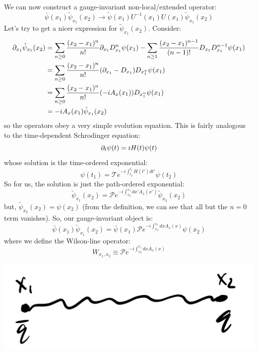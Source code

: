 We can now construct a gauge-invariant non-local/extended operator:
\begin{equation}
    \bar{\psi}(x_1)\tilde{\psi}_{x_1}(x_2) \to \tilde{\psi}(x_1)U^{-1}(x_1)U(x_1)\tilde{\psi}_{x_1}(x_2)
\end{equation}
Let's try to get a nicer expression for $\tilde{\psi}_{x_1}(x_2)$. Consider:
\begin{equation}
    \begin{split}
        \partial_{x_1}\tilde{\psi}_{x_1}(x_2) &= \sum_{n \geq 0}\frac{(x_2 - x_1)^n}{n!}\partial_{x_1}D^n_{x_1}\psi(x_1) - \sum_{n \geq 1} \frac{(x_2 - x_1)^{n-1}}{(n-1)!}D_{x_1}D_{x_1}^{n-1}\psi(x_1)
        \\ &= \sum_{n \geq 0}\frac{(x_2 - x_1)^n}{n!}(\partial_{x_1} - D_{x_1})D_{x_1^n}\psi(x_1)
        \\ &= \sum_{n \geq 0}\frac{(x_2 - x_1)^n}{n!}(-iA_{x}(x_1))D_{x_1^n}\psi(x_1)
        \\ &= -iA_x(x_1)\tilde{\psi}_{x_1}(x_2)
    \end{split}
\end{equation}
so the operators obey a very simple evolution equation. This is fairly analogous to the time-dependent Schrodinger equation:
\begin{equation}
    \partial_t \psi(t) = iH(t)\psi(t)
\end{equation}
whose solution is the time-ordered exponential:
\begin{equation}
    \psi(t_1) = \mathcal{T}e^{-i\int_{t_2}^{t_1}H(t')dt'}\psi(t_2)
\end{equation}
So for us, the solution is just the path-ordered exponential:
\begin{equation}
    \tilde{\psi}_{x_1}(x_2) = \mathcal{P}e^{-i\int_{x_2}^{x_1}dx'A_x(x')}\tilde{\psi}_{x_2}(x_2)
\end{equation}
but, $\tilde{\psi}_{x_2}(x_2) = \psi(x_2)$ (from the definition, we can see that all but the $n = 0$ term vanishes). So, our gauge-invariant object is:
\begin{equation}
    \bar{\psi}(x_1)\tilde{\psi}_{x_1}(x_2) = \bar{\psi}(x_1)\mathcal{P}e^{-i\int_{x_2}^{x_1}dx A_x(x)}\psi(x_2)
\end{equation}
where we define the Wilson-line operator:
\begin{equation}
    W_{x_1, x_2} \equiv \mathcal{P}e^{-i\int_{x_2}^{x_1}dx A_x(x)}
\end{equation}

\begin{center}
    \includegraphics[scale=0.35]{Lectures/Images/lec17-wilsonline.png}
\end{center}

